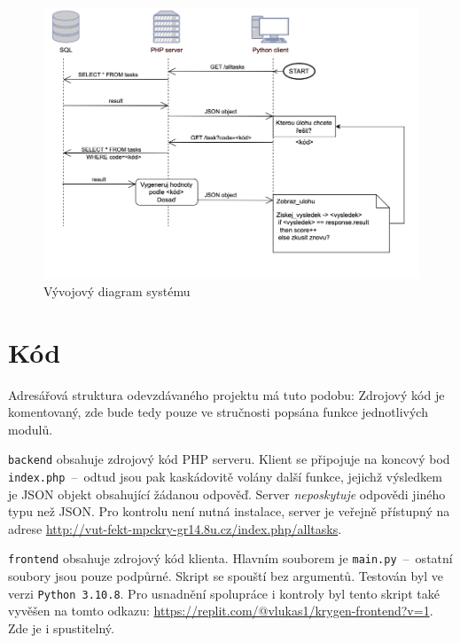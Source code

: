 \documentclass[titlepage]{article}
\begin{document}
\begin{figure}[p]
    \centering
    \includegraphics[width=.9\linewidth]{figures/diagram.png}
    \caption{Vývojový diagram systému}
    \label{fig:diagram}
\end{figure}

\section{Kód}
Adresářová struktura odevzdávaného projektu má tuto podobu:
Zdrojový kód je komentovaný, zde bude tedy pouze ve stručnosti popsána funkce jednotlivých modulů. 

\texttt{backend} obsahuje zdrojový kód PHP serveru. Klient se připojuje na koncový bod \texttt{index.php}~--~odtud jsou pak kaskádovitě volány další funkce, jejichž výsledkem je JSON objekt obsahující žádanou odpověď. Server \emph{neposkytuje} odpovědi jiného typu než JSON. Pro kontrolu není nutná instalace, server je veřejně přístupný na adrese \url{http://vut-fekt-mpckry-gr14.8u.cz/index.php/alltasks}.

\texttt{frontend} obsahuje zdrojový kód klienta. Hlavním souborem je \texttt{main.py}~--~ostatní soubory jsou pouze podpůrné. Skript se spouští bez argumentů. Testován byl ve verzi \texttt{Python 3.10.8}. Pro usnadnění spolupráce i kontroly byl tento skript také vyvěšen na tomto odkazu: \url{https://replit.com/@vlukas1/krygen-frontend?v=1}. Zde je i spustitelný. 
\end{document}

